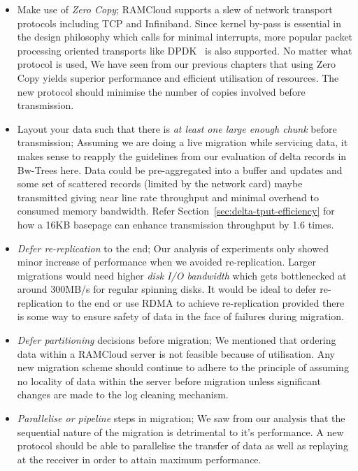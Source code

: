 \begin{itemize}
\item Make use of {\em Zero Copy}; RAMCloud supports a slew of network transport protocols including TCP and Infiniband. Since kernel by-pass is essential in the design philosophy which calls for minimal 
interrupts, more popular packet processing oriented transports like DPDK~\cite{dpdk} is also supported. No matter what protocol is used, We have seen from our previous chapters that 
using Zero Copy yields superior performance and efficient utilisation of resources. The new protocol should minimise the number of copies involved before transmission.

\item Layout your data such that there is {\em at least one large enough chunk} before transmission; Assuming we are doing a live migration while servicing data, it makes sense to reapply the guidelines 
from our evaluation of delta records in Bw-Trees here. Data could be pre-aggregated into a buffer
 and updates and some set of scattered records (limited by the network card) maybe 
 transmitted giving near line rate throughput and minimal overhead to consumed 
 memory bandwidth. Refer Section~\ref{sec:delta-tput-efficiency} for how a 16KB 
 basepage can enhance transmission throughput by 1.6 times.

\item {\em Defer re-replication} to the end; Our analysis of experiments only showed minor increase of performance when we avoided re-replication. 
Larger migrations would need higher {\em disk I/O bandwidth} which gets bottlenecked at around 
300MB/s for regular spinning disks. It would be ideal to defer re-replication to the end or use RDMA to achieve re-replication 
provided there is some way to ensure safety of data in the face of failures during migration.

\item {\em Defer partitioning} decisions before migration; We mentioned that ordering data within a RAMCloud server is not feasible because of utilisation. Any new migration scheme should continue to adhere to the principle of assuming no locality 
of data within the server before migration unless significant changes are made to the log cleaning mechanism.

\item {\em Parallelise or pipeline} steps in migration; We saw from our analysis that the sequential nature of the migration is detrimental to it's performance. A new protocol should be 
able to parallelise the transfer of data as well as replaying at the receiver in order to attain maximum performance. 

\end{itemize}

